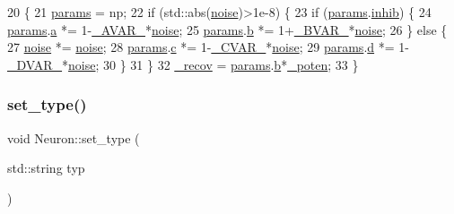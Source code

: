 \begin{DoxyCode}
20                                                             \{
21     \hyperlink{classNeuron_a9427965b6669c7c35c327689de7a4d63}{params} = np;
22     \textcolor{keywordflow}{if} (std::abs(\hyperlink{test__main_8cpp_aedb3acb007b8cca8efc63eed08f45705}{noise})>1e-8) \{
23         \textcolor{keywordflow}{if} (\hyperlink{classNeuron_a9427965b6669c7c35c327689de7a4d63}{params}.\hyperlink{structNeuronParams_a751856d77a821cbd361b774d8653bbe6}{inhib}) \{
24             \hyperlink{classNeuron_a9427965b6669c7c35c327689de7a4d63}{params}.\hyperlink{structNeuronParams_a359703733f5e70bbd67d019e45a3bc85}{a} *= 1-\hyperlink{globals_8h_a6ed83a2720f26c982b486bcd7398bda4}{\_AVAR\_}*\hyperlink{test__main_8cpp_aedb3acb007b8cca8efc63eed08f45705}{noise};
25             \hyperlink{classNeuron_a9427965b6669c7c35c327689de7a4d63}{params}.\hyperlink{structNeuronParams_abd1bd37179d8efa115a8749f9252f77d}{b} *= 1+\hyperlink{globals_8h_afeb27810410b4ad253c0cc446b56cbfd}{\_BVAR\_}*\hyperlink{test__main_8cpp_aedb3acb007b8cca8efc63eed08f45705}{noise};
26         \} \textcolor{keywordflow}{else} \{
27             \hyperlink{test__main_8cpp_aedb3acb007b8cca8efc63eed08f45705}{noise} *= \hyperlink{test__main_8cpp_aedb3acb007b8cca8efc63eed08f45705}{noise};
28             \hyperlink{classNeuron_a9427965b6669c7c35c327689de7a4d63}{params}.\hyperlink{structNeuronParams_a5df2ced2526eb84af2c8d2d34d9bfd93}{c} *= 1-\hyperlink{globals_8h_a6f19bdc067b5267c5f96db47062fef17}{\_CVAR\_}*\hyperlink{test__main_8cpp_aedb3acb007b8cca8efc63eed08f45705}{noise};
29             \hyperlink{classNeuron_a9427965b6669c7c35c327689de7a4d63}{params}.\hyperlink{structNeuronParams_af2bd3bad3bc5532186cdc8d056a10cfb}{d} *= 1-\hyperlink{globals_8h_ab562b7e46b970a109c23f7e3eaa10bf2}{\_DVAR\_}*\hyperlink{test__main_8cpp_aedb3acb007b8cca8efc63eed08f45705}{noise};
30         \}
31     \}
32     \hyperlink{classNeuron_a7bc9f5b85125f2c2596b64766796002b}{\_recov} = \hyperlink{classNeuron_a9427965b6669c7c35c327689de7a4d63}{params}.\hyperlink{structNeuronParams_abd1bd37179d8efa115a8749f9252f77d}{b}*\hyperlink{classNeuron_a7f7fdc3f9550b870351c60f618c11376}{\_poten};
33 \}
\end{DoxyCode}
\mbox{\label{classNeuron_a533359bca915ef99c96e50d4bfff58b2}} 
\subsubsection{\texorpdfstring{set\+\_\+type()}{set\_type()}}
{\footnotesize\ttfamily void Neuron\+::set\+\_\+type (\begin{DoxyParamCaption}\item[{std\+::string}]{typ }\end{DoxyParamCaption})}


